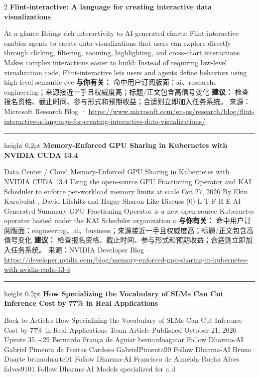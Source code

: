\documentclass[10.5pt]{ctexart}
\begin{document}
\begin{multicols}{2}
{\large\bfseries Flint-interactive: A language for creating interactive data visualizations}\par
At a glance Brings rich interactivity to AI-generated charts: Flint-interactive enables agents to create data visualizations that users can explore directly through clicking, filtering, zooming, highlighting, and cross-chart interactions. Makes complex interactions easier to build: Instead of requiring low-level visualization code, Flint-interactive lets users and agents define behaviors using high-level semantic eve
\textbf{与你有关：} 命中用户订阅版面：ai、research、engineering；来源接近一手且权威度高；标题/正文包含高信号变化
\textbf{建议：} 检查报名资格、截止时间、参与形式和预期收益；合适则立即加入任务系统。
{\footnotesize\color{ormuted} 来源：Microsoft Research Blog · \url{https://www.microsoft.com/en-us/research/blog/flint-interactive-a-language-for-creating-interactive-data-visualizations/}}
\vspace{2mm}
\hrule height 0.2pt
\vspace{2mm}
{\large\bfseries Memory-Enforced GPU Sharing in Kubernetes with NVIDIA CUDA 13.4}\par
Data Center / Cloud Memory-Enforced GPU Sharing in Kubernetes with NVIDIA CUDA 13.4 Using the open-source GPU Fractioning Operator and KAI Scheduler to enforce per-workload memory limits at scale Oct 27, 2026 By Ekin Karabulut , David Lifshitz and Hagay Sharon Like Discuss (0) L T F R E AI-Generated Summary GPU Fractioning Operator is a new open-source Kubernetes operator hosted under the KAI Scheduler organization o
\textbf{与你有关：} 命中用户订阅版面：engineering、ai、business；来源接近一手且权威度高；标题/正文包含高信号变化
\textbf{建议：} 检查报名资格、截止时间、参与形式和预期收益；合适则立即加入任务系统。
{\footnotesize\color{ormuted} 来源：NVIDIA Developer Blog · \url{https://developer.nvidia.com/blog/memory-enforced-gpu-sharing-in-kubernetes-with-nvidia-cuda-13-4}}
\vspace{2mm}
\hrule height 0.2pt
\vspace{2mm}
{\large\bfseries How Specializing the Vocabulary of SLMs Can Cut Inference Cost by 77\% in Real Applications}\par
Back to Articles How Specializing the Vocabulary of SLMs Can Cut Inference Cost by 77\% in Real Applications Team Article Published October 21, 2026 Upvote 35 +29 Bernardo França de Aguiar bernardoaguiar Follow Dharma-AI Gabriel Pimenta de Freitas Cardoso GabrielPimenta99 Follow Dharma-AI Bruno Duarte brunoduarte01 Follow Dharma-AI Francisco de Almeida Rocha Alves falves9101 Follow Dharma-AI Models specialized for a d

\end{multicols}
\end{document}
